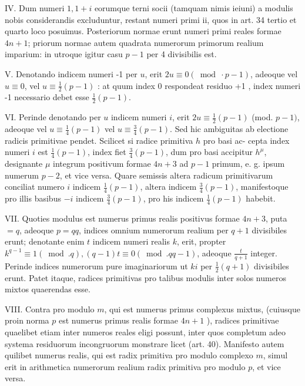 \documentclass[10pt]{article}
\begin{document}
IV. Dum numeri \(1,1+i\) eorumque terni socii (tamquam nimis ieiuni) a modulis nobis considerandis excluduntur, restant numeri primi ii, quos in art. 34 tertio et quarto loco posuimus. Posteriorum normae erunt numeri primi reales formae \(4 n+1\); priorum normae autem quadrata numerorum primorum realium imparium: in utroque igitur casu \(p-1\) per 4 divisibilis est.

V. Denotando indicem numeri -1 per \(u\), erit \(2 u \equiv 0(\bmod \cdot p-1)\), adeoque vel \(u \equiv 0\), vel \(u \equiv \frac{1}{2}(p-1)\) : at quum index 0 respondeat residuo +1 , index numeri -1 necessario debet esse \(\frac{1}{2}(p-1)\).

VI. Perinde denotando per \(u\) indicem numeri \(i\), erit \(2 u \equiv \frac{1}{2}(p-1)\) (mod. \(p-1)\), adeoque vel \(u \equiv \frac{1}{4}(p-1)\) vel \(u \equiv \frac{3}{4}(p-1)\). Sed hic ambiguitas ab electione radicis primitivae pendet. Scilicet si radice primitiva \(h\) pro basi ac-
cepta index numeri \(i\) est \(\frac{1}{4}(p-1)\), index fiet \(\frac{3}{4}(p-1)\), dum pro basi accipitur \(h^{\mu}\), designante \(\mu\) integrum positivum formae \(4 n+3\) ad \(p-1\) primum, e. g. ipsum numerum \(p-2\), et vice versa. Quare semissis altera radicum primitivarum conciliat numero \(i\) indicem \(\frac{1}{4}(p-1)\), altera indicem \(\frac{3}{4}(p-1)\), manifestoque pro illis basibus \(-i\) indicem \(\frac{3}{4}(p-1)\), pro his indicem \(\frac{1}{4}(p-1)\) habebit.

VII. Quoties modulus est numerus primus realis positivus formae \(4 n+3\), puta \(=q\), adeoque \(p=q q\), indices omnium numerorum realium per \(q+1\) divisibiles erunt; denotante enim \(t\) indicem numeri realis \(k\), erit, propter \(k^{q-1} \equiv 1(\bmod . q),(q-1) t \equiv 0(\bmod . q q-1)\), adeoque \(\frac{t}{q+1}\) integer. Perinde indices numerorum pure imaginariorum ut \(k i\) per \(\frac{1}{2}(q+1)\) divisibiles erunt. Patet itaque, radices primitivas pro talibus modulis inter solos numeros mixtos quaerendas esse.

VIII. Contra pro modulo \(m\), qui est numerus primus complexus mixtus, (cuiusque proin norma \(p\) est numerus primus realis formae \(4 n+1\) ), radices primitivae quaelibet etiam inter numeros reales eligi possunt, inter quos completum adeo systema residuorum incongruorum monstrare licet (art. 40). Manifesto autem quilibet numerus realis, qui est radix primitiva pro modulo complexo \(m\), si\(\mathrm{mul}\) erit in arithmetica numerorum realium radix primitiva pro modulo \(p\), et vice versa.
\end{document}
